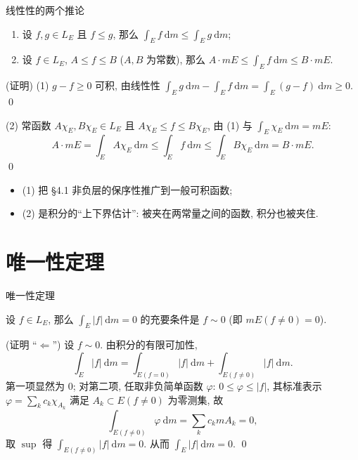 
\begin{frame}{线性性的两个推论}

\begin{cor}
\begin{enumerate}
\item 设 $f, g \in L_E$ 且 $f \leqslant g$, 那么 $\int_E f ~ \mathrm{d} m \leqslant \int_E g ~ \mathrm{d} m$;
\item 设 $f \in L_E$, $A \leqslant f \leqslant B$ ($A, B$ 为常数), 那么
$A \cdot mE \leqslant \int_E f ~ \mathrm{d} m \leqslant B \cdot mE$.
\end{enumerate}
\end{cor}

\startproof[bg=yellow, fg=red](证明)
(1) $g - f \geqslant 0$ 可积, 由线性性
$\int_E g ~ \mathrm{d} m - \int_E f ~ \mathrm{d} m = \int_E (g - f) ~ \mathrm{d} m \geqslant 0$. \qed

\pause

(2) 常函数 $A \chi_E, B \chi_E \in L_E$ 且 $A \chi_E \leqslant f \leqslant B \chi_E$, 由 (1) 与
$\int_E \chi_E ~ \mathrm{d} m = mE$:
\[
A \cdot mE = \int_E A \chi_E ~ \mathrm{d} m \leqslant \int_E f ~ \mathrm{d} m \leqslant \int_E B \chi_E ~ \mathrm{d} m = B \cdot mE .
\]
\qed

\pause

\begin{itemize}
\item (1) 把 \S 4.1 非负层的保序性推广到\alert{一般可积}函数;
\item (2) 是积分的``上下界估计'': 被夹在两常量之间的函数, 积分也被夹住.
\end{itemize}

\end{frame}


\section[唯一性]{唯一性定理}


\begin{frame}{唯一性定理}

\begin{thm}[唯一性]
设 $f \in L_E$, 那么 $\int_E |f| ~ \mathrm{d} m = 0$ 的\alert{充要条件}是 $f \sim 0$
(即 $mE(f \neq 0) = 0$).
\end{thm}

\startproof[bg=yellow, fg=red](证明 ``$\Leftarrow$'')
设 $f \sim 0$. 由积分的有限可加性,
\[
\int_E |f| ~ \mathrm{d} m = \int_{E(f = 0)} |f| ~ \mathrm{d} m + \int_{E(f \neq 0)} |f| ~ \mathrm{d} m .
\]
第一项显然为 $0$; 对第二项, 任取非负简单函数 $\varphi$: $0 \leqslant \varphi \leqslant |f|$, 其标准表示
$\varphi = \sum_k c_k \chi_{A_k}$ 满足 $A_k \subset E(f \neq 0)$ 为\alert{零测集}, 故
\[
\int_{E(f \neq 0)} \varphi ~ \mathrm{d} m = \sum_k c_k m A_k = 0 ,
\]
取 $\sup$ 得 $\int_{E(f \neq 0)} |f| ~ \mathrm{d} m = 0$. 从而 $\int_E |f| ~ \mathrm{d} m = 0$. \qed

\end{frame}

